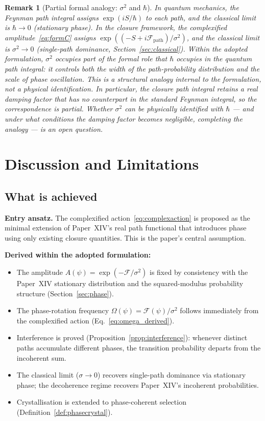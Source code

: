 \documentclass[12pt]{article}
\newtheorem{remark}[theorem]{Remark}
\newcommand{\Fcal}{\mathcal{F}}
\begin{document}
\begin{remark}[Partial formal analogy: $\sigma^2$ and $\hbar$]\label{rem:hbar}
In quantum mechanics, the Feynman path integral assigns $\exp(iS/\hbar)$ to each path, and the classical limit is $\hbar \to 0$ (stationary phase). In the closure framework, the complexified amplitude~\eqref{eq:formC} assigns $\exp((-S + i\Fcal_{\mathrm{path}})/\sigma^2)$, and the classical limit is $\sigma^2 \to 0$ (single-path dominance, Section~\ref{sec:classical}). Within the adopted formulation, $\sigma^2$ occupies part of the formal role that $\hbar$ occupies in the quantum path integral: it controls both the width of the path-probability distribution and the scale of phase oscillation. This is a structural analogy internal to the formulation, not a physical identification. In particular, the closure path integral retains a real damping factor that has no counterpart in the standard Feynman integral, so the correspondence is partial. Whether $\sigma^2$ can be physically identified with $\hbar$ --- and under what conditions the damping factor becomes negligible, completing the analogy --- is an open question.
\end{remark}

\section{Discussion and Limitations}\label{sec:discussion}

\subsection{What is achieved}

\textbf{Entry ansatz.} The complexified action~\eqref{eq:complexaction} is proposed as the minimal extension of Paper~XIV's real path functional that introduces phase using only existing closure quantities. This is the paper's central assumption.

\textbf{Derived within the adopted formulation:}
\begin{itemize}
    \item The amplitude $A(\psi) = \exp(-\Fcal/\sigma^2)$ is fixed by consistency with the Paper~XIV stationary distribution and the squared-modulus probability structure (Section~\ref{sec:phase}).
    \item The phase-rotation frequency $\Omega(\psi) = \Fcal(\psi)/\sigma^2$ follows immediately from the complexified action (Eq.~\ref{eq:omega_derived}).
    \item Interference is proved (Proposition~\ref{prop:interference}): whenever distinct paths accumulate different phases, the transition probability departs from the incoherent sum.
    \item The classical limit ($\sigma \to 0$) recovers single-path dominance via stationary phase; the decoherence regime recovers Paper~XIV's incoherent probabilities.
    \item Crystallisation is extended to phase-coherent selection (Definition~\ref{def:phasecrystal}).
\end{itemize}
\end{document}
